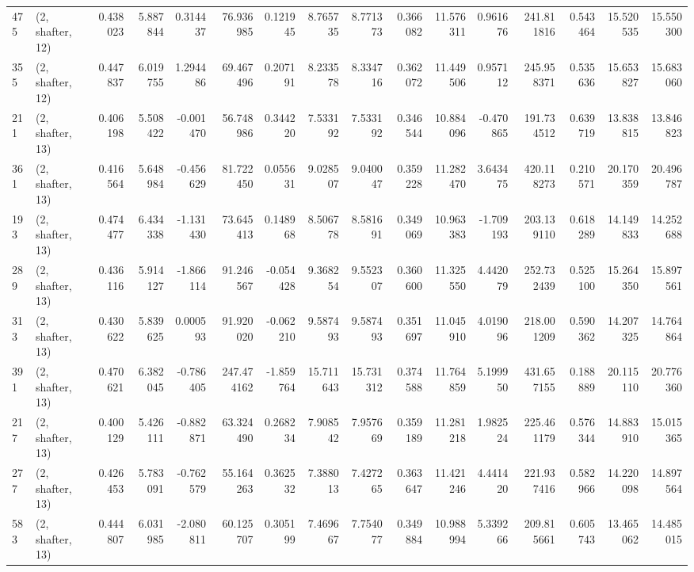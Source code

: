 \begin{tabular}{llrrrrrrrrrrrrrr}
475 &  (2, shafter, 12) &   0.438023 &   5.887844 &   0.314437 &    76.936985 &   0.121945 &   8.765735 &   8.771373 &  0.366082 &  11.576311 &   0.961676 &    241.811816 &   0.543464 &   15.520535 &   15.550300 \\
355 &  (2, shafter, 12) &   0.447837 &   6.019755 &   1.294486 &    69.467496 &   0.207191 &   8.233578 &   8.334716 &  0.362072 &  11.449506 &   0.957112 &    245.958371 &   0.535636 &   15.653827 &   15.683060 \\
211 &  (2, shafter, 13) &   0.406198 &   5.508422 &  -0.001470 &    56.748986 &   0.344220 &   7.533192 &   7.533192 &  0.346544 &  10.884096 &  -0.470865 &    191.734512 &   0.639719 &   13.838815 &   13.846823 \\
361 &  (2, shafter, 13) &   0.416564 &   5.648984 &  -0.456629 &    81.722450 &   0.055631 &   9.028507 &   9.040047 &  0.359228 &  11.282470 &   3.643475 &    420.118273 &   0.210571 &   20.170359 &   20.496787 \\
193 &  (2, shafter, 13) &   0.474477 &   6.434338 &  -1.131430 &    73.645413 &   0.148968 &   8.506778 &   8.581691 &  0.349069 &  10.963383 &  -1.709193 &    203.139110 &   0.618289 &   14.149833 &   14.252688 \\
289 &  (2, shafter, 13) &   0.436116 &   5.914127 &  -1.866114 &    91.246567 &  -0.054428 &   9.368254 &   9.552307 &  0.360600 &  11.325550 &   4.442079 &    252.732439 &   0.525100 &   15.264350 &   15.897561 \\
313 &  (2, shafter, 13) &   0.430622 &   5.839625 &   0.000593 &    91.920020 &  -0.062210 &   9.587493 &   9.587493 &  0.351697 &  11.045910 &   4.019096 &    218.001209 &   0.590362 &   14.207325 &   14.764864 \\
391 &  (2, shafter, 13) &   0.470621 &   6.382045 &  -0.786405 &   247.474162 &  -1.859764 &  15.711643 &  15.731312 &  0.374588 &  11.764859 &   5.199950 &    431.657155 &   0.188889 &   20.115110 &   20.776360 \\
217 &  (2, shafter, 13) &   0.400129 &   5.426111 &  -0.882871 &    63.324490 &   0.268234 &   7.908542 &   7.957669 &  0.359189 &  11.281218 &   1.982524 &    225.461179 &   0.576344 &   14.883910 &   15.015365 \\
277 &  (2, shafter, 13) &   0.426453 &   5.783091 &  -0.762579 &    55.164263 &   0.362532 &   7.388013 &   7.427265 &  0.363647 &  11.421246 &   4.441420 &    221.937416 &   0.582966 &   14.220098 &   14.897564 \\
583 &  (2, shafter, 13) &   0.444807 &   6.031985 &  -2.080811 &    60.125707 &   0.305199 &   7.469667 &   7.754077 &  0.349884 &  10.988994 &   5.339266 &    209.815661 &   0.605743 &   13.465062 &   14.485015 \\

\end{tabular}

